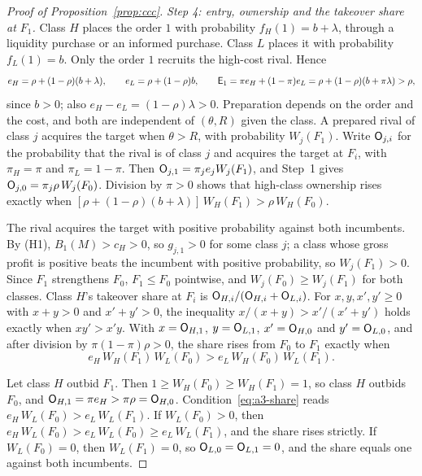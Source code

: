 \begin{proof}[Proof of Proposition~\ref{prop:ccc}]
\emph{Step 4: entry, ownership and the takeover share at \(F_1\).} Class \(H\) places the order \(1\) with
probability \(f_H(1)=b+\lambda\), through a liquidity purchase or an informed purchase. Class \(L\) places it with
probability \(f_L(1)=b\). Only the order \(1\) recruits the high-cost rival. Hence
\[
e_H=\rho+(1-\rho)(b+\lambda),\qquad e_L=\rho+(1-\rho)b,\qquad
\mathsf{E}_1=\pi e_H+(1-\pi)e_L=\rho+(1-\rho)(b+\pi\lambda)>\rho ,
\]
since \(b>0\); also \(e_H-e_L=(1-\rho)\lambda>0\). Preparation depends on the order and the cost, and both are
independent of \((\theta,R)\) given the class. A prepared rival of class \(j\) acquires the target when
\(\theta>R\), with probability \(W_j(F_1)\). Write \(\mathsf{O}_{j,i}\) for the probability that the rival is of class
\(j\) and acquires the target at \(F_i\), with \(\pi_H=\pi\) and \(\pi_L=1-\pi\). Then
\(\mathsf{O}_{j,1}=\pi_je_jW_j(F_1)\), and Step~1 gives \(\mathsf{O}_{j,0}=\pi_j\rho\,W_j(F_0)\). Division by \(\pi>0\) shows
that high-class ownership rises exactly when \([\rho+(1-\rho)(b+\lambda)]\,W_H(F_1)>\rho\,W_H(F_0)\).

The rival acquires the target with positive probability against both incumbents. By (H1),
\(B_1(M)>c_H>0\), so \(g_{j,1}>0\) for some class \(j\); a class whose gross profit is positive beats the incumbent
with positive probability, so \(W_j(F_1)>0\). Since \(F_1\) strengthens \(F_0\), \(F_1\le F_0\) pointwise, and
\(W_j(F_0)\ge W_j(F_1)\) for both classes. Class \(H\)'s takeover share at \(F_i\) is
\(\mathsf{O}_{H,i}/(\mathsf{O}_{H,i}+\mathsf{O}_{L,i})\). For \(x,y,x',y'\ge0\) with \(x+y>0\) and \(x'+y'>0\), the inequality
\(x/(x+y)>x'/(x'+y')\) holds exactly when \(xy'>x'y\). With \(x=\mathsf{O}_{H,1}\), \(y=\mathsf{O}_{L,1}\), \(x'=\mathsf{O}_{H,0}\) and
\(y'=\mathsf{O}_{L,0}\), and after division by \(\pi(1-\pi)\rho>0\), the share rises from \(F_0\) to \(F_1\) exactly when
\[
e_H\,W_H(F_1)\,W_L(F_0)>e_L\,W_H(F_0)\,W_L(F_1).
\]

Let class \(H\) outbid \(F_1\). Then \(1\ge W_H(F_0)\ge W_H(F_1)=1\), so class \(H\) outbids \(F_0\), and
\(\mathsf{O}_{H,1}=\pi e_H>\pi\rho=\mathsf{O}_{H,0}\). Condition~\eqref{eq:a3-share} reads \(e_H\,W_L(F_0)>e_L\,W_L(F_1)\). If
\(W_L(F_0)>0\), then \(e_H\,W_L(F_0)>e_L\,W_L(F_0)\ge e_L\,W_L(F_1)\), and the share rises strictly. If
\(W_L(F_0)=0\), then \(W_L(F_1)=0\), so \(\mathsf{O}_{L,0}=\mathsf{O}_{L,1}=0\), and the share equals one against both
incumbents.


\end{proof}
